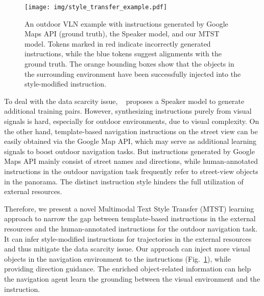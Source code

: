 \documentclass[11pt,a4paper]{article}
\begin{document}
\begin{figure}[t]
    \centering
    \texttt{[image: img/style\_transfer\_example.pdf]}
    \caption{An outdoor VLN example with instructions generated by Google Maps API (ground truth), the Speaker model, and our MTST model. Tokens marked in red indicate incorrectly generated instructions, while the blue tokens suggest alignments with the ground truth. The orange bounding boxes show that the objects in the surrounding environment have been successfully injected into the style-modified instruction.}
    \label{fig:style_transfer_example}
\end{figure}


To deal with the data scarcity issue, ~\citet{fried2018speakerfollower} proposes a Speaker model to generate additional training pairs. 
However, synthesizing instructions purely from visual signals is hard, especially for outdoor environments, due to visual complexity.
On the other hand, template-based navigation instructions on the street view can be easily obtained via the Google Map API, which may serve as additional learning signals to boost outdoor navigation tasks. 
But instructions generated by Google Maps API mainly consist of street names and directions, while human-annotated instructions in the outdoor navigation task frequently refer to street-view objects in the panorama. 
The distinct instruction style hinders the full utilization of external resources.

Therefore, we present a novel Multimodal Text Style Transfer (MTST) learning approach to narrow the gap between template-based instructions in the external resources and the human-annotated instructions for the outdoor navigation task. It can infer style-modified instructions for trajectories in the external resources and thus mitigate the data scarcity issue.
Our approach can inject more visual objects in the navigation environment to the instructions (Fig.~\ref{fig:style_transfer_example}), while providing direction guidance. The enriched object-related information can help the navigation agent learn the grounding between the visual environment and the instruction.
\end{document}
